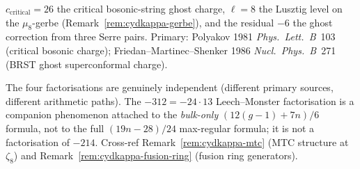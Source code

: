 \begin{remark}[\texorpdfstring{$c_{2d}=-214$}{c-2d=-214} and its four factorisations]
\begin{enumerate}
 $c_{\mathrm{critical}} = 26$ the critical bosonic-string ghost
 charge, $\ell = 8$ the Lusztig level on the $\mu_8$-gerbe
 (Remark~\ref{rem:cydkappa-gerbe}), and the residual $-6$
 the ghost correction from three Serre pairs. Primary: Polyakov
 1981 \emph{Phys.~Lett.~B}~103 (critical bosonic charge);
 Friedan--Martinec--Shenker 1986 \emph{Nucl.~Phys.~B}~271
 (BRST ghost superconformal charge).
\end{enumerate}
The four factorisations are genuinely independent (different primary
sources, different arithmetic paths). The $-312 = -24\cdot 13$
Leech--Monster factorisation is a companion phenomenon attached to the
\emph{bulk-only} $(12(g-1)+7n)/6$ formula, not to the full
$(19n-28)/24$ max-regular formula; it is not a factorisation of $-214$.
Cross-ref Remark~\ref{rem:cydkappa-mtc} (MTC structure at $\zeta_8$)
and Remark~\ref{rem:cydkappa-fusion-ring}
(fusion ring generators).
\end{remark}

